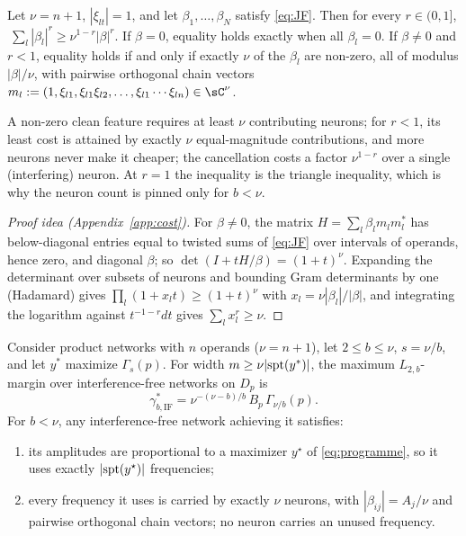 \begin{lemma}\label{lem:cost}
Let $\nu=n+1$, $|\xi_{lt}|=1$, and let $\beta_1,\dots,\beta_N$ satisfy \eqref{eq:JF}. Then for every $r\in(0,1]$, $\ \sum_l|\beta_l|^r\ge\nu^{1-r}|\beta|^r$. If $\beta=0$, equality holds exactly when all $\beta_l=0$. If $\beta\neq0$ and $r<1$, equality holds if and only if exactly $\nu$ of the $\beta_l$ are non-zero, all of modulus $|\beta|/\nu$, with pairwise orthogonal chain vectors $m_l:=(1,\xi_{l1},\xi_{l1}\xi_{l2},\dots,\xi_{l1}\cdots\xi_{ln})\in\sC^\nu$.
\end{lemma}

A non-zero clean feature requires at least $\nu$ contributing neurons; for $r<1$, its least cost is attained by exactly $\nu$ equal-magnitude contributions, and more neurons never make it cheaper; the cancellation costs a factor $\nu^{1-r}$ over a single (interfering) neuron. At $r=1$ the inequality is the triangle inequality, which is why the neuron count is pinned only for $b<\nu$.

\begin{proof}[Proof idea (Appendix~\ref{app:cost})]
For $\beta\neq0$, the matrix $H=\sum_l\beta_lm_lm_l^*$ has below-diagonal entries equal to twisted sums of \eqref{eq:JF} over intervals of operands, hence zero, and diagonal $\beta$; so $\det(I+tH/\beta)=(1+t)^\nu$. Expanding the determinant over subsets of neurons and bounding Gram determinants by one (Hadamard) gives $\prod_l(1+x_lt)\ge(1+t)^\nu$ with $x_l=\nu|\beta_l|/|\beta|$, and integrating the logarithm against $t^{-1-r}dt$ gives $\sum_lx_l^r\ge\nu$.
\end{proof}

\begin{theorem}\label{thm:cyclic}
Consider product networks with $n$ operands ($\nu=n+1$), let $2\le b\le\nu$, $s=\nu/b$, and let $y^*$ maximize $\Gamma_s(p)$. For width $m\ge\nu|\mathrm{spt}(y^*)|$, the maximum $L_{2,b}$-margin over interference-free networks on $D_p$ is
\[
\gamma^*_{b,\mathrm{IF}}=\nu^{-(\nu-b)/b}\,B_p\,\Gamma_{\nu/b}(p).
\]
For $b<\nu$, any interference-free network achieving it satisfies:
\begin{enumerate}
  \item its amplitudes are proportional to a maximizer $y^\star$ of \eqref{eq:programme}, so it uses exactly $|\mathrm{spt}(y^\star)|$ frequencies;
  \item every frequency it uses is carried by exactly $\nu$ neurons, with $|\beta_{ij}|=A_j/\nu$ and pairwise orthogonal chain vectors; no neuron carries an unused frequency.
\end{enumerate}
\end{theorem}

